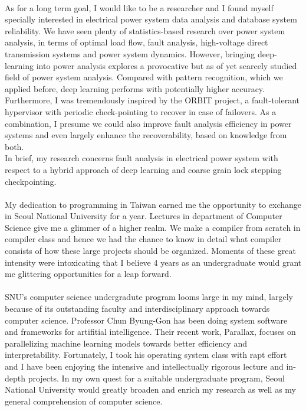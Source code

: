 \documentclass{article}
\begin{document}
\\
As for a long term goal, I would like to be a researcher and I found myself specially interested in electrical power system data analysis and database system reliability. We have seen plenty of statistics-based research over power system analysis, in terms of optimal load flow, fault analysis, high-voltage direct transmission systems and power system dynamics. However, bringing deep-learning into power analysis explores a provocative but as of yet scarcely studied field of power system analysis. Compared with pattern recognition, which we applied before, deep learning performs with potentially higher accuracy. Furthermore, I was tremendously inspired by the ORBIT project, a fault-tolerant hypervisor with periodic check-pointing to recover in case of failovers. As a combination, I presume we could also improve fault analysis efficiency in power systems and even largely enhance the recoverability, based on knowledge from both.\\
In brief, my research concerns fault analysis in electrical power system with respect to a hybrid approach of deep learning and coarse grain lock stepping checkpointing. \\
\\
My dedication to programming in Taiwan earned me the opportunity to exchange in Seoul National University for a year. Lectures in department of Computer Science give me a glimmer of a higher realm. We make a compiler from scratch in compiler class and hence we had the chance to know in detail what compiler consists of how these large projects should be organized. Moments of these great intensity were intoxicating that I believe 4 years as an undergraduate would grant me glittering opportunities for a leap forward. \\
\\
SNU's computer science undergradute program looms large in my mind, largely because of its outstanding faculty and interdisciplinary approach towards computer science. Professor Chun Byung-Gon has been doing system software and frameworks for artifitial intelligence. Their recent work, Parallax, focuses on parallelizing machine learning models towards better efficiency and interpretability. Fortunately, I took his operating system class with rapt effort and I have been enjoying the intensive and intellectually rigorous lecture and in-depth projects. In my own quest for a suitable undergraduate program, Seoul National University would greatly broaden and enrich my research as well as my general comprehension of computer science. \\
\end{document}

